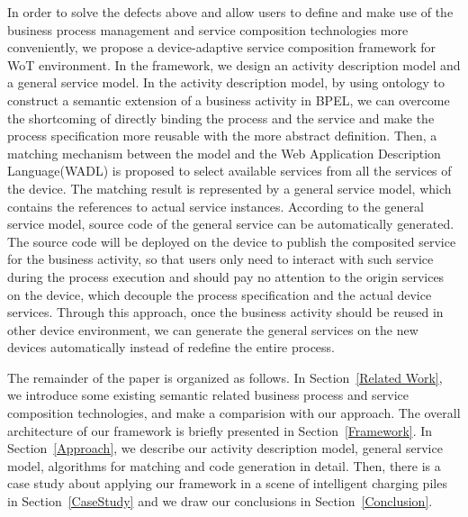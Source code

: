 In order to solve the defects above and allow users to define and make use of the business process management and service composition technologies more conveniently, we propose a device-adaptive service composition framework for WoT environment. In the framework, we design an activity description model and a general service model. In the activity description model, by using ontology to construct a semantic extension of a business activity in BPEL, we can overcome the shortcoming of directly binding the process and the service and  make the process specification more reusable with the more abstract definition. Then, a matching mechanism between the model and the Web Application Description Language(WADL) is proposed to select available services from all the services of the device. The matching result is represented by a general service model, which contains the references to actual service instances. According to the general service model, source code of the general service can be automatically generated. The source code  will be deployed on the device to publish the composited service for the business activity, so that users only need to interact with such service during the process execution and should pay no attention to the origin services on the device, which decouple the process specification and the actual device services. Through this approach, once the business activity should be reused in other device environment, we can generate the general services on the new devices automatically instead of redefine the entire process. 

The remainder of the paper is organized as follows. In Section~\ref{Related Work}, we introduce some existing semantic related business process and service composition technologies, and make a comparision with our approach. The overall architecture of our framework is briefly presented in Section~\ref{Framework}. In Section~\ref{Approach}, we describe our activity description model, general service model, algorithms for matching and code generation in detail. Then, there is a case study about applying our framework in a scene of intelligent charging piles in Section~\ref{CaseStudy} and we draw our conclusions in Section~\ref{Conclusion}. 
